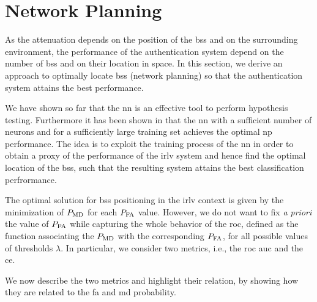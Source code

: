 \documentclass[conference,draftcls,onecolumn]{IEEEtran}
\begin{document}


\section{Network Planning}\label{sec:bsPos}

As the attenuation depends on the position of the \acp{bs} and on the surrounding environment, the performance of the authentication system depend on the number of \acp{bs} and on their location in space. In this section, we derive an approach to optimally locate \acp{bs} (network planning) so that the authentication system attains the best performance. 

We have shown so far that the \ac{nn} is an effective tool to perform hypothesis testing. Furthermore it has been shown in \cite{nostro} that the \ac{nn} with a sufficient number of neurons and for a sufficiently large training set achieves the optimal \ac{np} performance. The idea is to exploit the training process of the \ac{nn} in order to obtain a proxy of the performance of the \ac{irlv} system and hence find the optimal location of the \acp{bs}, such that the resulting system attains the best classification perfrormance.

The optimal solution for \acp{bs} positioning in the \ac{irlv} context is given by the minimization of $P_{\rm MD}$ for each $P_{\rm FA}$ value. However, we do not want to fix {\em a priori} the value of $P_{\rm FA}$ while capturing the whole behavior of the \ac{roc}, defined as the  function associating the $P_{\rm MD}$ with the corresponding $P_{\rm FA}$, for all possible values of thresholds $\lambda$. In particular, we consider two metrics, i.e., the   \ac{roc} \ac{auc} \cite{hanley-82} and the \ac{ce}. 

We now describe the two metrics and highlight their relation, by showing how they  are related to the \ac{fa} and \ac{md} probability.
\end{document}
